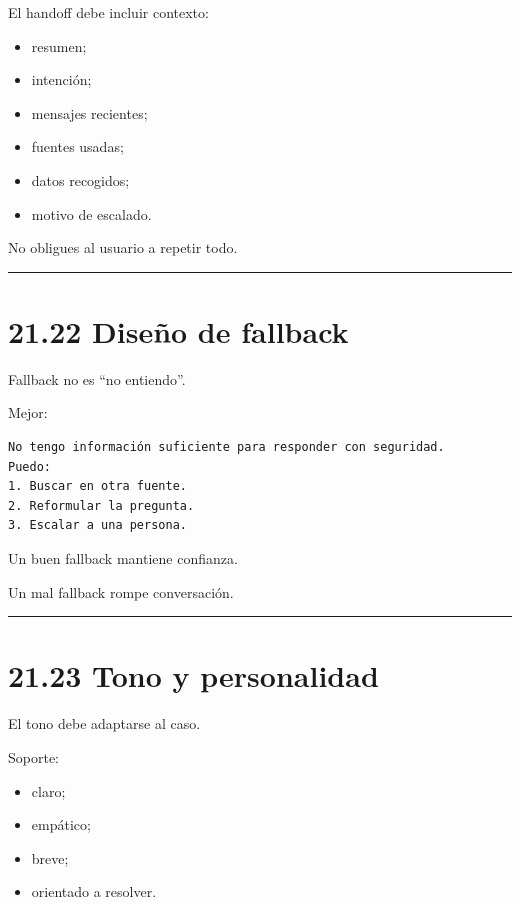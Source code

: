 El handoff debe incluir contexto:

\begin{itemize}
\tightlist
\item
  resumen;
\item
  intención;
\item
  mensajes recientes;
\item
  fuentes usadas;
\item
  datos recogidos;
\item
  motivo de escalado.
\end{itemize}

No obligues al usuario a repetir todo.

\begin{center}\rule{0.5\linewidth}{0.5pt}\end{center}

\section{21.22 Diseño de fallback}\label{diseuxf1o-de-fallback}

Fallback no es ``no entiendo''.

Mejor:

\begin{lstlisting}
No tengo información suficiente para responder con seguridad.
Puedo:
1. Buscar en otra fuente.
2. Reformular la pregunta.
3. Escalar a una persona.
\end{lstlisting}

Un buen fallback mantiene confianza.

Un mal fallback rompe conversación.

\begin{center}\rule{0.5\linewidth}{0.5pt}\end{center}

\section{21.23 Tono y personalidad}\label{tono-y-personalidad}

El tono debe adaptarse al caso.

Soporte:

\begin{itemize}
\tightlist
\item
  claro;
\item
  empático;
\item
  breve;
\item
  orientado a resolver.
\end{itemize}

